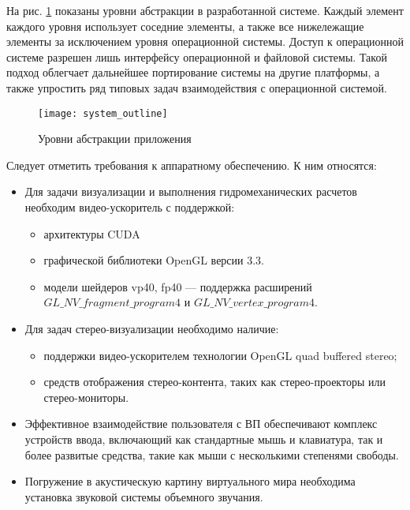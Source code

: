 На рис. \ref{ship_dfd} показаны уровни абстракции в разработанной системе. 
Каждый элемент каждого уровня использует соседние элементы, а также все нижележащие элементы за исключением уровня операционной системы. Доступ к операционной системе разрешен лишь интерфейсу операционной и файловой системы. Такой подход облегчает дальнейшее портирование системы на другие платформы, а также упростить ряд типовых задач взаимодействия с операционной системой.

\begin{figure}[ht]
	\begin{center}
	\texttt{[image: system\_outline]}
	\end{center}
	\caption{Уровни абстракции приложения}
	\label{ship_dfd}
\end{figure}

Следует отметить требования к аппаратному обеспечению. К ним относятся:
\begin{itemize}
	\item	Для задачи визуализации и выполнения гидромеханических расчетов необходим 
	видео-ускоритель с поддержкой:
		\begin{itemize}
			\item	архитектуры CUDA
			\item	графической библиотеки OpenGL версии 3.3.
			\item	модели шейдеров  vp40, fp40 --- поддержка расширений \linebreak
			$GL\_NV\_fragment\_program4$ и $GL\_NV\_vertex\_program4$.
		\end{itemize}
	\item	Для задач стерео-визуализации необходимо наличие:
		\begin{itemize}
			\item	поддержки видео-ускорителем технологии OpenGL quad buffered stereo;
			\item	средств отображения стерео-контента, 
					таких как стерео-проекторы или стерео-мониторы.
		\end{itemize}	
	\item	Эффективное взаимодействие пользователя с ВП обеспечивают комплекс устройств ввода, включающий как стандартные мышь и клавиатура, так и более развитые средства, такие как мыши с несколькими степенями свободы.
	\item 	Погружение в акустическую картину виртуального мира необходима установка звуковой системы объемного звучания. 
\end{itemize}

